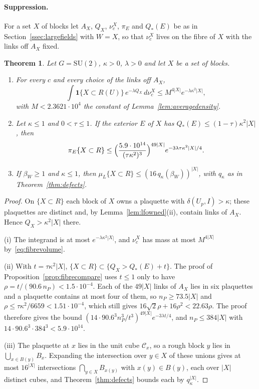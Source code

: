 \documentclass[11pt]{amsart}
\newtheorem{theorem}{Theorem}[section]
\theoremstyle{definition}
\theoremstyle{remark}
\numberwithin{equation}{section}
\newcommand{\SU}{\mathrm{SU}}
\begin{document}
\paragraph*{Suppression.}
For a set $X$ of blocks let $A_X$, $Q_X$, $\nu^X_c$, $\pi_E$ and $Q_*(E)$ be
as in Section~\ref{ssec:largefields} with $W=X$, so that $\nu^X_c$ lives on the
fibre of $X$ with the links off $A_X$ fixed.

\begin{theorem}\label{thm:lfsuppression}
Let $G=\SU(2)$, $\kappa>0$, $\lambda>0$ and let $X$ be a set of blocks.
\begin{enumerate}[label=\textup{(\roman*)},leftmargin=*]
\item For every $c$ and every choice of the links off $A_X$,
\[
\int\mathbf 1\{X\subset R(U)\}\,e^{-\lambda Q_X}\,d\nu^X_c\le M^{4|X|}
e^{-\lambda\kappa^2|X|},
\]
with $M<2.3621\cdot10^4$ the constant of Lemma~\ref{lem:averagedensity}.
\item Let $\kappa\le1$ and $0<\tau\le1$. If the exterior $E$ of $X$ has
$Q_*(E)\le(1-\tau)\kappa^2|X|$, then
\[
\pi_E\{X\subset R\}\le\Bigl(\frac{5.9\cdot10^{14}}{(\tau\kappa^2)^3}
\Bigr)^{49|X|}e^{-3\lambda\tau\kappa^2|X|/4}.
\]
\item If $\beta_W\ge1$ and $\kappa\le1$, then $\mu_L\{X\subset R\}\le
(16\,q_\kappa(\beta_W))^{|X|}$, with $q_\kappa$ as in
Theorem~\ref{thm:defects}.
\end{enumerate}
\end{theorem}

\begin{proof}
On $\{X\subset R\}$ each block of $X$ owns a plaquette with $\delta(U_p,I)
>\kappa$; these plaquettes are distinct and, by Lemma~\ref{lem:lfowned}(ii),
contain links of $A_X$. Hence $Q_X>\kappa^2|X|$ there.

(i) The integrand is at most $e^{-\lambda\kappa^2|X|}$, and $\nu^X_c$ has
mass at most $M^{4|X|}$ by~\eqref{eq:fibrevolume}.

(ii) With $t=\tau\kappa^2|X|$, $\{X\subset R\}\subset\{Q_X>Q_*(E)+t\}$. The
proof of Proposition~\ref{prop:fibrecompare} uses $t\le1$ only to have
$\rho=t/(90.6\,n_P)<1.5\cdot10^{-4}$. Each of the $49|X|$ links of $A_X$
lies in six plaquettes and a plaquette contains at most four of them, so
$n_P\ge73.5|X|$ and $\rho\le\tau\kappa^2/6659<1.51\cdot10^{-4}$, which
still gives $16\sqrt2\rho+16\rho^2<22.63\rho$. The proof therefore gives
the bound $(14\cdot90.6^3n_P^3/t^3)^{49|X|}e^{-3\lambda t/4}$, and $n_P\le
384|X|$ with $14\cdot90.6^3\cdot384^3<5.9\cdot10^{14}$.

(iii) The plaquette at $x$ lies in the unit cube $\mathcal C_x$, so a rough
block $y$ lies in $\bigcup_{x\in B(y)}B_x$. Expanding the intersection over
$y\in X$ of these unions gives at most $16^{|X|}$ intersections $\bigcap_{y
\in X}B_{x(y)}$ with $x(y)\in B(y)$, each over $|X|$ distinct cubes, and
Theorem~\ref{thm:defects} bounds each by $q_\kappa^{|X|}$.
\end{proof}
\end{document}
